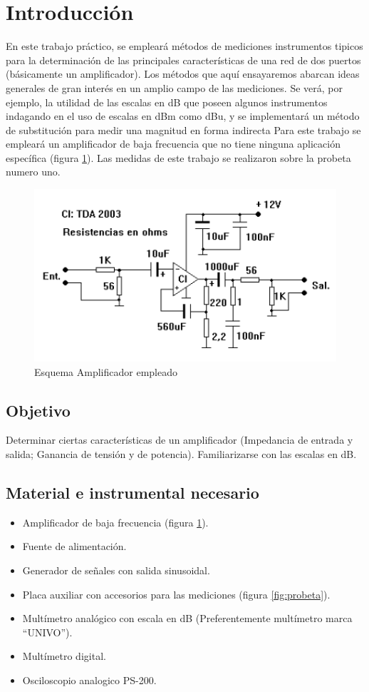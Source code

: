 \documentclass[12pt, letterpaper]{article}
\begin{document}
\newpage
\tableofcontents
\newpage

\section{Introducción}
En este trabajo práctico, se empleará métodos de mediciones instrumentos tipicos para la determinación de las principales características de una red de dos puertos (básicamente un amplificador). Los métodos que aquí ensayaremos abarcan ideas generales de gran interés en un amplio campo de las mediciones. Se verá, por ejemplo, la utilidad de las escalas en dB que poseen algunos instrumentos indagando en el uso de escalas en dBm 
 como dBu, y se implementará un método de substitución para medir una magnitud en forma indirecta Para este trabajo se empleará un amplificador de baja frecuencia que no tiene ninguna aplicación específica (figura \ref{fig:esq_amp}). Las medidas de este trabajo se realizaron sobre la probeta numero uno. 
\begin{figure}[H]
	\centering
	\includegraphics{imagenes/amplificador.png}
	\caption{Esquema Amplificador empleado}
    \label{fig:esq_amp}
\end{figure}

\subsection{Objetivo}
Determinar ciertas características de un amplificador (Impedancia de entrada y salida;
Ganancia de tensión y de potencia). Familiarizarse con las escalas en dB.

\subsection{Material e instrumental necesario}
\begin{itemize}
    \item Amplificador de baja frecuencia (figura \ref{fig:esq_amp}).
\item  Fuente de alimentación.
\item  Generador de señales con salida sinusoidal.
\item  Placa auxiliar con accesorios para las mediciones (figura \ref{fig:probeta}).
\item  Multímetro analógico con escala en dB (Preferentemente multímetro marca “UNIVO”).
\item  Multímetro digital.
\item Osciloscopio analogico  PS-200.
\end{itemize}
\end{document}
